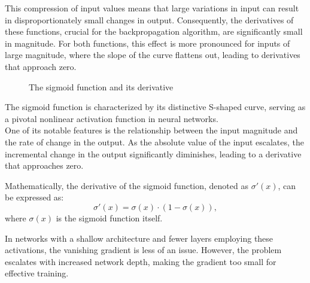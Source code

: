 This compression of input values means that large variations in input can result in disproportionately small changes in output. 
Consequently, the derivatives of these functions, crucial for the backpropagation algorithm, are significantly small in magnitude. 
For both functions, this effect is more pronounced for inputs of large magnitude, where the slope of the curve flattens out, leading to derivatives that approach zero.

\begin{figure}[ht]
  \centering
  \caption{The sigmoid function and its derivative}
  \label{fig:Sigmoid}
\end{figure}

The sigmoid function is characterized by its distinctive S-shaped curve, serving as a pivotal nonlinear activation function in neural networks.\\
One of its notable features is the relationship between the input magnitude and the rate of change in the output. 
As the absolute value of the input escalates, the incremental change in the output significantly diminishes, leading to a derivative that approaches zero. 

Mathematically, the derivative of the sigmoid function, denoted as $\sigma'(x)$, can be expressed as:
\begin{equation}
\sigma'(x) = \sigma(x) \cdot (1 - \sigma(x)),
\end{equation}
where $\sigma(x)$ is the sigmoid function itself. 

In networks with a shallow architecture and fewer layers employing these activations, the vanishing gradient is less of an issue. 
However, the problem escalates with increased network depth, making the gradient too small for effective training.


